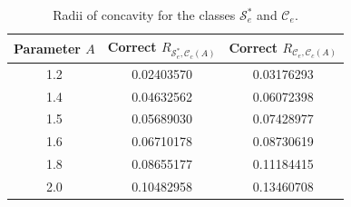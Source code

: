 \documentclass[12pt]{article}
\begin{document}
\begin{table}[h!]
\centering
\caption{Radii of concavity for the classes $\mathcal{S}_e^*$ and $\mathcal{C}_e$.}
\label{tab1}
\setlength{\extrarowheight}{3pt}
\small
\begin{tabular}{ccc}
\toprule
\textbf{Parameter } $A$ & \textbf{Correct } $R_{\mathcal{S}_e^*,\mathcal{C}_c(A)}$ & \textbf{Correct } $R_{\mathcal{C}_e,\mathcal{C}_c(A)}$ \\
\midrule
1.2 & 0.02403570 & 0.03176293 \\
1.4 & 0.04632562 & 0.06072398 \\
1.5 & 0.05689030 & 0.07428977 \\
1.6 & 0.06710178 & 0.08730619 \\
1.8 & 0.08655177 & 0.11184415 \\
2.0 & 0.10482958 & 0.13460708 \\
\bottomrule
\end{tabular}
\end{table}
\end{document}
